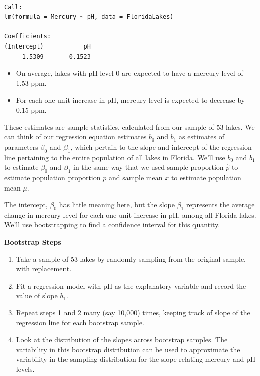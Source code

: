 \documentclass[
  letterpaper,
  DIV=11,
  numbers=noendperiod]{scrreprt}
\providecommand{\tightlist}{%
  \setlength{\itemsep}{0pt}\setlength{\parskip}{0pt}}\usepackage{longtable,booktabs,array}
\begin{document}
\begin{verbatim}

Call:
lm(formula = Mercury ~ pH, data = FloridaLakes)

Coefficients:
(Intercept)           pH  
     1.5309      -0.1523  
\end{verbatim}

\begin{itemize}
\tightlist
\item
  On average, lakes with pH level 0 are expected to have a mercury level
  of 1.53 ppm.\\
\item
  For each one-unit increase in pH, mercury level is expected to
  decrease by 0.15 ppm.
\end{itemize}

These estimates are sample statistics, calculated from our sample of 53
lakes. We can think of our regression equation estimates \(b_0\) and
\(b_1\) as estimates of parameters \(\beta_0\) and \(\beta_1\), which
pertain to the slope and intercept of the regression line pertaining to
the entire population of all lakes in Florida. We'll use \(b_0\) and
\(b_1\) to estimate \(\beta_0\) and \(\beta_1\) in the same way that we
used sample proportion \(\hat{p}\) to estimate population proportion
\(p\) and sample mean \(\bar{x}\) to estimate population mean \(\mu\).

The intercept, \(\beta_0\) has little meaning here, but the slope
\(\beta_1\) represents the average change in mercury level for each
one-unit increase in pH, among all Florida lakes. We'll use
bootstrapping to find a confidence interval for this quantity.

\textbf{Bootstrap Steps}

\begin{enumerate}
\def\labelenumi{\arabic{enumi}.}
\item
  Take a sample of 53 lakes by randomly sampling from the original
  sample, with replacement.
\item
  Fit a regression model with pH as the explanatory variable and record
  the value of slope \(b_1\).
\item
  Repeat steps 1 and 2 many (say 10,000) times, keeping track of slope
  of the regression line for each bootstrap sample.
\item
  Look at the distribution of the slopes across bootstrap samples. The
  variability in this bootstrap distribution can be used to approximate
  the variability in the sampling distribution for the slope relating
  mercury and pH levels.
\end{enumerate}
\end{document}
